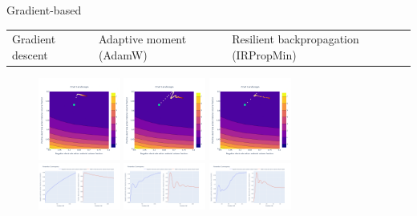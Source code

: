 \documentclass[aspectratio=169]{beamer}
\begin{document}
\begin{frame}{Gradient-based}
    \vspace{-6mm}
    \begin{table}[]
        \centering
        \footnotesize
    \begin{tabularx}{0.86\textwidth}{*{3}{Y}}
         Gradient descent &
         Adaptive moment (AdamW) &
         Resilient backpropagation (IRPropMin)
    \end{tabularx}
    \end{table}

    \vspace{-6mm}
    \begin{figure}
        \centering
        \includegraphics[width=0.24\textwidth]{Images/Optimisers/graddesc_cost.png}
        \includegraphics[width=0.24\textwidth]{Images/Optimisers/adamw_cost.png}
        \includegraphics[width=0.24\textwidth]{Images/Optimisers/irpropmin_cost.png} ~~~\\
        \includegraphics[width=0.24\textwidth]{Images/Optimisers/graddesc_params.png}
        \includegraphics[width=0.24\textwidth]{Images/Optimisers/adamw_params.png}
        \includegraphics[width=0.24\textwidth]{Images/Optimisers/irpropmin_params.png}
        \label{fig:optimisers1}
    \end{figure}
\end{frame}
\end{document}
